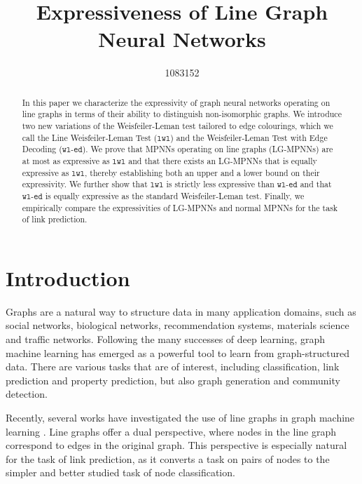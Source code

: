 \documentclass{article}
\title{Expressiveness of Line Graph Neural Networks}
\author{%
    1083152
}
\newcommand{\wledge}{\texttt{wl-ed}}
\newcommand{\lwl}{\texttt{lwl}}
\begin{document}
\maketitle


\begin{abstract}
    In this paper we characterize the expressivity of graph neural networks operating on line graphs in terms of their ability to distinguish non-isomorphic graphs. We introduce two new variations of the Weisfeiler-Leman test tailored to edge colourings, which we call the Line Weisfeiler-Leman Test ($\lwl$) and the Weisfeiler-Leman Test with Edge Decoding ($\wledge$). We prove that MPNNs operating on line graphs (LG-MPNNs) are at most as expressive as $\lwl$ and that there exists an LG-MPNNs that is equally expressive as $\lwl$, thereby establishing both an upper and a lower bound on their expressivity. We further show that $\lwl$ is strictly less expressive than $\wledge$ and that $\wledge$ is equally expressive as the standard Weisfeiler-Leman test.
    Finally, we empirically compare the expressivities of LG-MPNNs and normal MPNNs for the task of link prediction.
\end{abstract}


\section{Introduction}
Graphs are a natural way to structure data in many application domains, such as social networks, biological networks, recommendation systems, materials science and traffic networks.
Following the many successes of deep learning, graph machine learning has emerged as a powerful tool to learn from graph-structured data. There are various tasks that are of interest, including classification, link prediction and property prediction, but also graph generation and community detection.

Recently, several works have investigated the use of line graphs in graph machine learning \cite{cai2021line,choudhary2021atomistic,liu2021indigo}. Line graphs offer a dual perspective, where nodes in the line graph correspond to edges in the original graph. This perspective is especially natural for the task of link prediction, as it converts a task on pairs of nodes to the simpler and better studied task of node classification.
\end{document}

